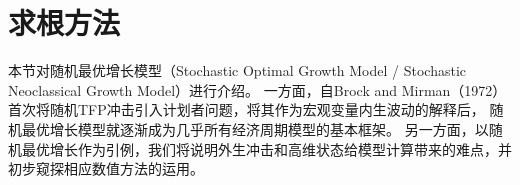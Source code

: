 
\section{求根方法}    \label{sec-rootfinding}

本节对随机最优增长模型（Stochastic Optimal Growth Model / Stochastic Neoclassical Growth Model）进行介绍。
一方面，自Brock and Mirman（1972）首次将随机TFP冲击引入计划者问题，将其作为宏观变量内生波动的解释后，
随机最优增长模型就逐渐成为几乎所有经济周期模型的基本框架。
另一方面，以随机最优增长作为引例，我们将说明外生冲击和高维状态给模型计算带来的难点，并初步窥探相应数值方法的运用。


